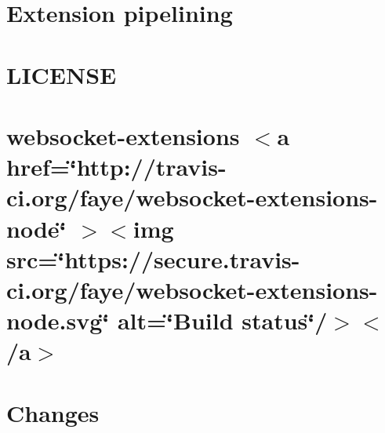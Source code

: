 \documentclass[twoside]{book}
\newcommand{\+}{\discretionary{\mbox{\scriptsize$\hookleftarrow$}}{}{}}
\begin{document}
\chapter{Extension pipelining}
\label{md__c___users_vaishnavi_jadhav__desktop__developer_code_mean_stack_example_client_node_modules_w311209d5b79fc36f0da9594a58c7769e}

\chapter{LICENSE}
\label{md__c___users_vaishnavi_jadhav__desktop__developer_code_mean_stack_example_client_node_modules_wa2a486371b4d64c704917b4b0f768832}

\chapter{websocket-\/extensions \texorpdfstring{$<$}{<}a href=\char`\"{}http\+://travis-\/ci.\+org/faye/websocket-\/extensions-\/node\char`\"{} \texorpdfstring{$>$}{>}\texorpdfstring{$<$}{<}img src=\char`\"{}https\+://secure.\+travis-\/ci.\+org/faye/websocket-\/extensions-\/node.\+svg\char`\"{} alt=\char`\"{}\+Build status\char`\"{}/\texorpdfstring{$>$}{>}\texorpdfstring{$<$}{<}/a\texorpdfstring{$>$}{>}}
\label{md__c___users_vaishnavi_jadhav__desktop__developer_code_mean_stack_example_client_node_modules_w09207c8408b2561709b9ceb3492e6761}

\chapter{Changes}
\label{md__c___users_vaishnavi_jadhav__desktop__developer_code_mean_stack_example_client_node_modules_which__c_h_a_n_g_e_l_o_g}

\end{document}
